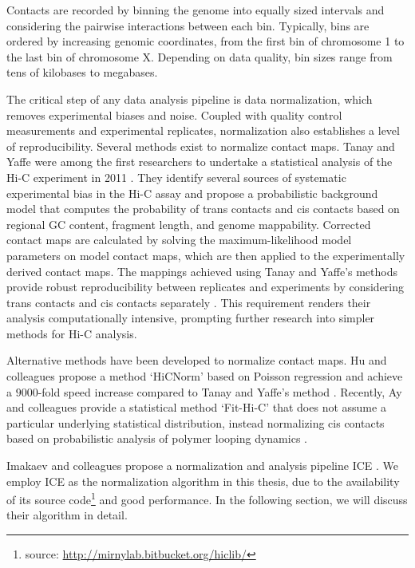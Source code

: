 Contacts are recorded by binning the genome into equally sized intervals and considering the pairwise interactions between each bin.
Typically, bins are ordered by increasing genomic coordinates, from the first bin of chromosome 1 to the last bin of chromosome X.
Depending on data quality, bin sizes range from tens of kilobases to megabases.

The critical step of any data analysis pipeline is data \gls{normalization}, which removes experimental biases and noise.  Coupled with quality
control measurements and experimental replicates, normalization also establishes a level of reproducibility.
Several methods exist to normalize contact maps.  Tanay and Yaffe were among the first researchers to undertake a statistical analysis of the
Hi-C experiment in 2011 \citep{yaffe2011}.  They identify several sources of systematic experimental bias in the Hi-C assay and propose a
probabilistic background model that computes the probability of \glspl{trans contact} and \glspl{cis contact} based on regional
\gls{GC} content, fragment length, and genome mappability.  Corrected contact maps are calculated by solving the maximum-likelihood model
parameters on model contact maps, which are then applied to the experimentally derived contact maps.  The mappings
achieved using Tanay and Yaffe's methods provide robust reproducibility between replicates and experiments by considering
\glspl{trans contact} and \glspl{cis contact} separately \citep{yaffe2011}.  This requirement renders their analysis computationally
intensive, prompting further research into simpler methods for Hi-C analysis.

Alternative methods have been developed to normalize contact maps.  Hu and colleagues propose a method `HiCNorm' based on Poisson
regression and achieve a $9000$-fold speed increase compared to Tanay and Yaffe's method \citep{hu2012}.  Recently, Ay and colleagues provide a statistical
method `Fit-Hi-C' that does not assume a particular underlying statistical distribution, instead normalizing \glspl{cis contact} based on probabilistic
analysis of polymer looping dynamics \citep{ay2014}.

Imakaev and colleagues propose a normalization and analysis pipeline \gls{ICE} \citep{imakaev2012}.  We employ \gls{ICE} as the normalization
algorithm in this thesis, due to the availability of its source code\footnote{source: \url{http://mirnylab.bitbucket.org/hiclib/}} and good
performance.  In the following section, we will discuss their algorithm in detail.


